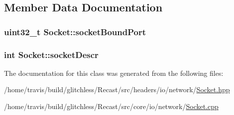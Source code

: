 \subsection{Member Data Documentation}
\hypertarget{class_socket_ab05ebf38966e1cd1f093819a6bdad5b1}{
\subsubsection[{socket\-Bound\-Port}]{\setlength{\rightskip}{0pt plus 5cm}uint32\-\_\-t Socket\-::socket\-Bound\-Port\hspace{0.3cm}{\ttfamily [protected]}}}\label{class_socket_ab05ebf38966e1cd1f093819a6bdad5b1}
\hypertarget{class_socket_a610fbf456550dd084cfaee9d1267e5c8}{
\subsubsection[{socket\-Descr}]{\setlength{\rightskip}{0pt plus 5cm}int Socket\-::socket\-Descr\hspace{0.3cm}{\ttfamily [protected]}}}\label{class_socket_a610fbf456550dd084cfaee9d1267e5c8}


The documentation for this class was generated from the following files\-:\begin{DoxyCompactItemize}
\item 
/home/travis/build/glitchless/\-Recast/src/headers/io/network/\hyperlink{_socket_8hpp}{Socket.\-hpp}\item 
/home/travis/build/glitchless/\-Recast/src/core/io/network/\hyperlink{_socket_8cpp}{Socket.\-cpp}\end{DoxyCompactItemize}
